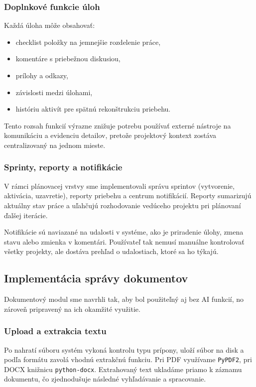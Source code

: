 \documentclass[12pt, a4paper]{article}
\begin{document}
\begin{titlepage}
\subsubsection{Doplnkové funkcie úloh}
Každá úloha môže obsahovať:
\begin{itemize}
    \item checklist položky na jemnejšie rozdelenie práce,
    \item komentáre s priebežnou diskusiou,
    \item prílohy a odkazy,
    \item závislosti medzi úlohami,
    \item históriu aktivít pre spätnú rekonštrukciu priebehu.
\end{itemize}

Tento rozsah funkcií výrazne znižuje potrebu používať externé nástroje na komunikáciu a evidenciu detailov, pretože projektový kontext zostáva centralizovaný na jednom mieste.

\subsubsection{Sprinty, reporty a notifikácie}
V rámci plánovacej vrstvy sme implementovali správu sprintov (vytvorenie, aktivácia, uzavretie), reporty priebehu a centrum notifikácií. Reporty sumarizujú aktuálny stav práce a uľahčujú rozhodovanie vedúceho projektu pri plánovaní ďalšej iterácie.

Notifikácie sú naviazané na udalosti v systéme, ako je priradenie úlohy, zmena stavu alebo zmienka v komentári. Používateľ tak nemusí manuálne kontrolovať všetky projekty, ale dostáva prehľad o udalostiach, ktoré sa ho týkajú.

\subsection{Implementácia správy dokumentov}
Dokumentový modul sme navrhli tak, aby bol použiteľný aj bez AI funkcií, no zároveň pripravený na ich okamžité využitie.

\subsubsection{Upload a extrakcia textu}
Po nahratí súboru systém vykoná kontrolu typu prípony, uloží súbor na disk a podľa formátu zavolá vhodnú extrakčnú funkciu. Pri PDF využívame \texttt{PyPDF2}, pri DOCX knižnicu \texttt{python-docx}. Extrahovaný text ukladáme priamo k záznamu dokumentu, čo zjednodušuje následné vyhľadávanie a spracovanie.


\end{titlepage}
\end{document}
